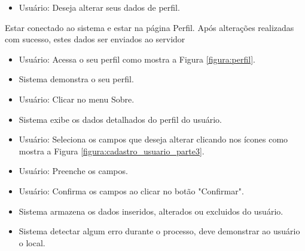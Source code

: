 {
\begin{itemize}
	\item Usuário: Deseja alterar seus dados de perfil.	
\end{itemize}
}
{Estar conectado ao sistema e estar na página Perfil.}
{Após alterações realizadas com sucesso, estes dados ser enviados ao servidor}
{
\begin{itemize}
	\item Usuário: Acessa o seu perfil como mostra a Figura \ref{figura:perfil}.
	\item Sistema demonstra o seu perfil.
	\item Usuário: Clicar no menu Sobre.
 	\item Sistema exibe os dados detalhados do perfil do usuário.
	\item Usuário: Seleciona os campos que deseja alterar clicando nos ícones como mostra a Figura \ref{figura:cadastro_usuario_parte3}.
	\item Usuário: Preenche os campos.
	\item Usuário: Confirma os campos ao clicar no botão "Confirmar".
	\item Sistema armazena os dados inseridos, alterados ou excluidos do usuário.
	\item Sistema detectar algum erro durante o processo, deve demonstrar ao usuário o local.
\end{itemize}
}
